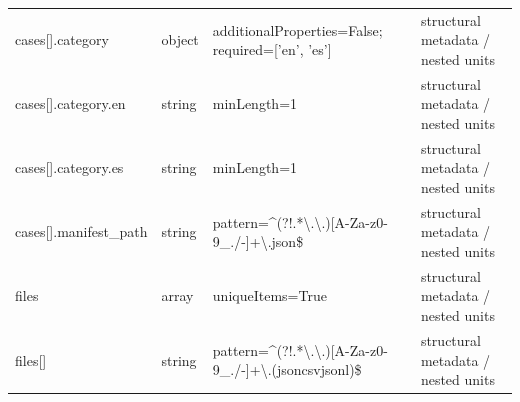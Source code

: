 \begin{longtable}{@{}>{\raggedright\arraybackslash}p{}>{\raggedright\arraybackslash}p{}>{\raggedright\arraybackslash}p{}>{\raggedright\arraybackslash}p{}@{}}
cases[].\allowbreak{}category & object & additionalProperties=\allowbreak{}False; required=\allowbreak{}['en', 'es'] & structural metadata /\allowbreak{} nested units\\
cases[].\allowbreak{}category.\allowbreak{}en & string & minLength=\allowbreak{}1 & structural metadata /\allowbreak{} nested units\\
cases[].\allowbreak{}category.\allowbreak{}es & string & minLength=\allowbreak{}1 & structural metadata /\allowbreak{} nested units\\
cases[].\allowbreak{}manifest\_\allowbreak{}path & string & pattern=\allowbreak{}\textasciicircum{}(?!.\allowbreak{}*\textbackslash{}.\allowbreak{}\textbackslash{}.\allowbreak{})[A-\allowbreak{}Za-\allowbreak{}z0-9\_\allowbreak{}.\allowbreak{}/\allowbreak{}-]+\textbackslash{}.\allowbreak{}json\$ & structural metadata /\allowbreak{} nested units\\
files & array & uniqueItems=\allowbreak{}True & structural metadata /\allowbreak{} nested units\\
files[] & string & pattern=\allowbreak{}\textasciicircum{}(?!.\allowbreak{}*\textbackslash{}.\allowbreak{}\textbackslash{}.\allowbreak{})[A-\allowbreak{}Za-\allowbreak{}z0-9\_\allowbreak{}.\allowbreak{}/\allowbreak{}-]+\textbackslash{}.\allowbreak{}(json\textbar{}\allowbreak{}csv\textbar{}\allowbreak{}jsonl)\$ & structural metadata /\allowbreak{} nested units\\
\end{longtable}\endgroup
